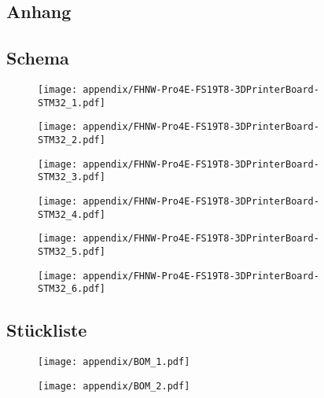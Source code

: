 \begin{appendix} %
\section{Anhang}
\label{sec:Anhang}

\subsection{Schema}
\label{app:Schema}

\begin{figure}[h!]
	\centering
	\texttt{[image: appendix/FHNW-Pro4E-FS19T8-3DPrinterBoard-STM32\_1.pdf]}
\end{figure}
\begin{figure}[h]
	\centering
	\texttt{[image: appendix/FHNW-Pro4E-FS19T8-3DPrinterBoard-STM32\_2.pdf]}
\end{figure}
\begin{figure}[h]
	\centering
	\texttt{[image: appendix/FHNW-Pro4E-FS19T8-3DPrinterBoard-STM32\_3.pdf]}
\end{figure}
\begin{figure}[h]
	\centering
	\texttt{[image: appendix/FHNW-Pro4E-FS19T8-3DPrinterBoard-STM32\_4.pdf]}
\end{figure}
\begin{figure}[h]
	\centering
	\texttt{[image: appendix/FHNW-Pro4E-FS19T8-3DPrinterBoard-STM32\_5.pdf]}
\end{figure}
\begin{figure}[h]
	\centering
	\texttt{[image: appendix/FHNW-Pro4E-FS19T8-3DPrinterBoard-STM32\_6.pdf]}
\end{figure}
\clearpage



\subsection{Stückliste}
\label{app:Stückliste}
\begin{figure}[h!]
	\centering
	\texttt{[image: appendix/BOM\_1.pdf]}
\end{figure}

\begin{figure}[h]
	\centering
	\texttt{[image: appendix/BOM\_2.pdf]}
\end{figure}
\clearpage


\end{appendix}
